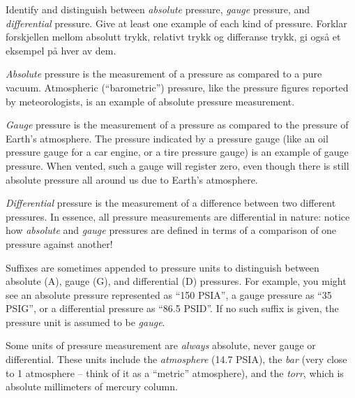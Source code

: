 

Identify and distinguish between {\it absolute} pressure, {\it gauge} pressure, and {\it differential} pressure.  Give at least one example of each kind of pressure.
Forklar forskjellen mellom absolutt trykk, relativt trykk og differanse trykk, gi også et eksempel på hver av dem. 







{\it Absolute} pressure is the measurement of a pressure as compared to a pure vacuum.  Atmospheric (``barometric'') pressure, like the pressure figures reported by meteorologists, is an example of absolute pressure measurement.

{\it Gauge} pressure is the measurement of a pressure as compared to the pressure of Earth's atmosphere.  The pressure indicated by a pressure gauge (like an oil pressure gauge for a car engine, or a tire pressure gauge) is an example of gauge pressure.  When vented, such a gauge will register zero, even though there is still absolute pressure all around us due to Earth's atmosphere.

{\it Differential} pressure is the measurement of a difference between two different pressures.  In essence, all pressure measurements are differential in nature: notice how {\it absolute} and {\it gauge} pressures are defined in terms of a comparison of one pressure against another!

Suffixes are sometimes appended to pressure units to distinguish between absolute (A), gauge (G), and differential (D) pressures.  For example, you might see an absolute pressure represented as ``150 PSIA'', a gauge pressure as ``35 PSIG'', or a differential pressure as ``86.5 PSID''.  If no such suffix is given, the pressure unit is assumed to be {\it gauge}.

Some units of pressure measurement are {\it always} absolute, never gauge or differential.  These units include the {\it atmosphere} (14.7 PSIA), the {\it bar} (very close to 1 atmosphere -- think of it as a ``metric'' atmosphere), and the {\it torr}, which is absolute millimeters of mercury column.











